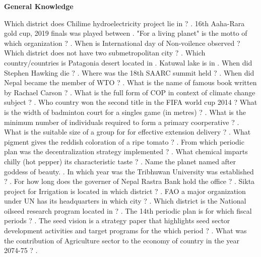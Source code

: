 \documentclass[10pt,a4paper,answers]{exam}
\begin{document}
\begin{center}
{\textbf {\LARGE General Knowledge}}
\end{center}

\begin{questions}
  \question Which district does Chilime hydroelectricity project lie in ? \fillin[Rasuwa][3cm].
  \question 16th Aaha-Rara gold cup, 2019 finals was played between .
  \question "For a living planet" is the motto of which organization ? \fillin[WWF][3cm].
  \question When is International day of Non-voilence observed ? \fillin[October 2][3cm]
  \question Which district does not have two submetropolitan city ? \fillin[Rupandehi][3cm].
  \question Which country/countries is Patagonia desert located in .
  \question Katuwal lake is in \fillin[Kathmandu][3cm].
  \question When did Stephen Hawking die ? \fillin[March 14, 2018][4cm].
  \question Where was the 18th SAARC summit held ? \fillin[Nepal][3cm].
  \question When did Nepal became the member of WTO ? .
  \question What is the name of famous book written by Rachael Carson ? .
  \question What is the full form of COP in context of climate change subject ? .
  \question Who country won the second title in the FIFA world cup 2014 ? \fillin[Argentina][3cm]
  \question What is the width of badminton court for a singles game (in metres) ? \fillin[5.18 metres][3cm].
  \question What is the minimum number of individuals required to form a primary coorperative ? \fillin[25][3cm].
  \question What is the suitable size of a group for for effective extension delivery ? \fillin[8-10][3cm].
  \question What pigment gives the reddish coloration of a ripe tomato ? \fillin[Lycopene][3cm].
  \question From which periodic plan was the decentralization strategy implemented ? \fillin[7th plan][3cm].
  \question What chemical imparts chilly (hot pepper) its characteristic taste ? \fillin[Capsaicin][3cm].
  \question Name the planet named after goddess of beauty. \fillin[Venus][3cm].
  \question In which year was the Tribhuwan University was established ? \fillin[2016 BS][3cm].
  \question For how long does the governer of Nepal Rastra Bank hold the office ? \fillin[5 years][3cm].
  \question Sikta project for Irrigation is located in which district ? \fillin[Banke][3cm].
  \question FAO a major organization under UN has its headquarters in which city ? \fillin[Rome][3cm].
  \question Which district is the National oilseed research program located in ? \fillin[Sarlahi][3cm].
  \question The 14th periodic plan is for which fiscal periods ? \fillin[2073/74 - 2075/76 BS][4cm].
  \question The seed vision is a strategy paper that highlights seed sector development activities and target programs for the which period ? \fillin[2013-25][3cm].
  \question What was the contribution of Agriculture sector to the economy of country in the year 2074-75 ? \fillin[27\%][3cm].
\end{questions}
\end{document}
